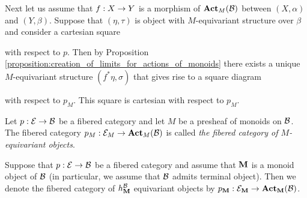 Next let us assume that $f:X\rightarrow Y$ is a morphism of $\mathbf{Act}_{M}({\mathcal B})$ between $(X,\alpha)$ and $(Y,\beta)$. Suppose that $(\eta,\tau)$ is object with $M$-equivariant structure over $\beta$ and consider a cartesian square
\begin{center}
\end{center}
with respect to $p$. Then by Proposition \ref{proposition:creation_of_limits_for_actions_of_monoids} there exists a unique $M$-equivariant structure $(f^*\eta,\sigma)$ that gives rise to a square diagram
\begin{center}
\end{center}
with respect to $p_M$. This square is cartesian with respect to $p_M$.

\begin{definition}
Let $p:{\mathcal E} \rightarrow {\mathcal B}$ be a fibered category and let $M$ be a presheaf of monoids on ${\mathcal B}$. The fibered category $p_M:{\mathcal E}_M\rightarrow \mathbf{Act}_M({\mathcal B})$ is called \textit{the fibered category of $M$-equivariant objects}.
\end{definition}
\noindent
Suppose that $p:{\mathcal E} \rightarrow {\mathcal B}$ be a fibered category and assume that $\mathbf{M}$ is a monoid object of ${\mathcal B}$ (in particular, we assume that ${\mathcal B}$ admits terminal object). Then we denote the fibered category of $h^{{\mathcal B}}_{\mathbf{M}}$ equivariant objects by $p_{\mathbf{M}}:{\mathcal E}_{\mathbf{M}}\rightarrow \mathbf{Act}_{\mathbf{M}}({\mathcal B})$.

